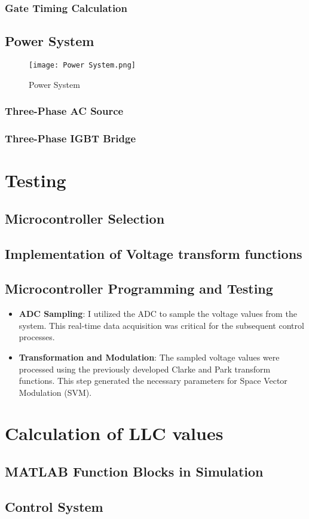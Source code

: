 \subsubsection{Gate Timing Calculation}


\subsection{Power System}
\begin{figure}[h]
    \centering
    \texttt{[image: Power System.png]}
    \caption{Power System}
    \label{fig:Power System}
\end{figure}

\subsubsection{Three-Phase AC Source}

\subsubsection{Three-Phase IGBT Bridge}


\section{Testing}


\subsection{Microcontroller Selection}

\subsection{Implementation of Voltage transform functions}

\subsection{Microcontroller Programming and Testing}

\begin{itemize}
    \item \textbf{ADC Sampling}: I utilized the ADC to sample the voltage values from the system. This real-time data acquisition was critical for the subsequent control processes.
    \item \textbf{Transformation and Modulation}: The sampled voltage values were processed using the previously developed Clarke and Park transform functions. This step generated the necessary parameters for Space Vector Modulation (SVM).
\end{itemize}
\noindent


\section{Calculation of LLC values}

\subsection{MATLAB Function Blocks in Simulation}

\subsection{Control System}

